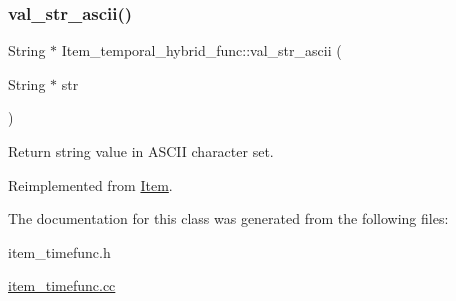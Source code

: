 \subsubsection{\texorpdfstring{val\+\_\+str\+\_\+ascii()}{val\_str\_ascii()}}
{\footnotesize\ttfamily String $\ast$ Item\+\_\+temporal\+\_\+hybrid\+\_\+func\+::val\+\_\+str\+\_\+ascii (\begin{DoxyParamCaption}\item[{String $\ast$}]{str }\end{DoxyParamCaption})\hspace{0.3cm}{\ttfamily [virtual]}}

Return string value in A\+S\+C\+II character set. 

Reimplemented from \mbox{\hyperlink{classItem}{Item}}.



The documentation for this class was generated from the following files\+:\begin{DoxyCompactItemize}
\item 
item\+\_\+timefunc.\+h\item 
\mbox{\hyperlink{item__timefunc_8cc}{item\+\_\+timefunc.\+cc}}\end{DoxyCompactItemize}
